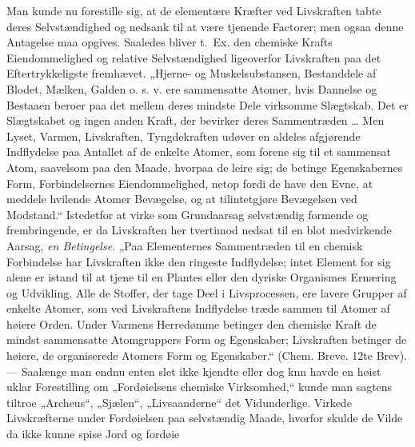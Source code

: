 \documentclass[12pt,a4paper]{book}
\begin{document}
Man kunde nu forestille sig, at de elementære Kræfter ved
Livskraften tabte deres Selvstændighed og nedsank til at være
tjenende Factorer; men ogsaa denne Antagelse maa opgives. Saaledes
bliver t.~Ex. den chemiske Krafts Eiendommelighed og relative
Selvstændighed ligeoverfor Livskraften paa det Eftertrykkeligste
fremhævet. „Hjerne- og Muskelsubstansen, Bestanddele af Blodet,
Mælken, Galden o. s. v. ere sammensatte Atomer, hvis Dannelse og
Bestaaen beroer
paa det mellem deres mindste Dele virksomme Slægtskab. Det er
Slægtskabet og ingen anden Kraft, der bevirker deres Sammentræden
\ldots{} Men Lyset, Varmen, Livskraften, Tyngdekraften udøver en
aldeles afgjørende Indflydelse paa Antallet af de enkelte Atomer,
som forene sig til et sammensat Atom, saavelsom paa den Maade,
hvorpaa de leire sig; de betinge Egenskabernes Form, Forbindelsernes
Eiendommelighed, netop fordi de have den Evne, at meddele hvilende
Atomer Bevægelse, og at tilintetgjøre Bevægelsen ved Modstand.“
Istedetfor at virke som Grundaarsag selvstændig formende og
frembringende, er da Livskraften her tvertimod nedsat til en blot
medvirkende Aarsag, \emph{en Betingelse}. „Paa Elementernes Sammentræden
til en chemisk Forbindelse har Livskraften ikke den ringeste
Indflydelse; intet Element for sig alene er istand til at tjene til
en Plantes eller den dyriske Organismes Ernæring og Udvikling. Alle
de Stoffer, der tage Deel i Livsprocessen, ere lavere Grupper af
enkelte Atomer, som ved Livskraftens Indflydelse træde sammen til
Atomer af høiere Orden. Under Varmens Herredømme betinger den
chemiske Kraft de mindst sammensatte Atomgruppers Form og
Egenskaber; Livskraften betinger de høiere, de organiserede Atomers
Form og Egenskaber.“ (Chem. Breve. 12te Brev). --- Saalænge man
endnu enten slet ikke kjendte eller dog knn havde en høist uklar
Forestilling om „Fordøielsens chemiske Virksomhed,“ kunde man
sagtens tiltroe „Archeus“, „Sjælen“, „Livsaanderne“ det Vidunderlige.
Virkede Livskræfterne under Fordøielsen paa selvstændig Maade,
hvorfor skulde de Vilde da ikke kunne spise Jord og fordøie
\end{document}
